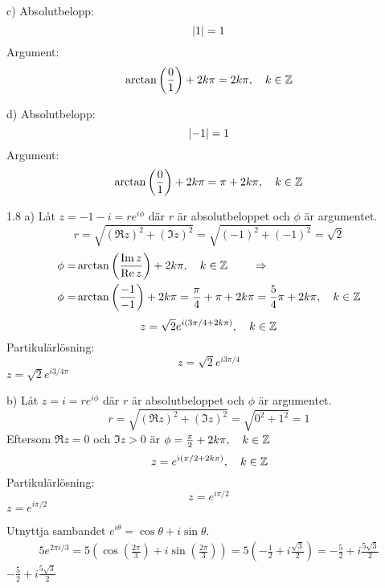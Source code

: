 \begin{task}{c)}
	Absolutbelopp:
	\[\left|1\right|=1\]
	Argument:
	\[\arctan\left(\frac{0}{1}\right)+2k\pi=2k\pi, \quad k\in\mathbb{Z}\]
\end{task}

\begin{task}{d)}
	Absolutbelopp:
	\[\left|-1\right|=1\]
	Argument:
	\[\arctan\left(\frac{0}{1}\right)+2k\pi=\pi+2k\pi, \quad k\in\mathbb{Z}\]
\end{task}

\begin{task}{1.8 a)}
	Låt $z = -1-i = re^{i\phi}$ där $r$ är absolutbeloppet och $\phi$ är argumentet.
	\[r=\sqrt{(\Re z)^2+(\Im z)^2}=
	\sqrt{(-1)^2+(-1)^2}=
	\sqrt{2}\]
	\begin{align*}
		\phi=&\arctan\left(\frac{\Im z}{\Re z}\right)+2k\pi\cond{k\inset{Z}} \qquad \ra \\
		\phi=&\arctan\left(\frac{-1}{-1}\right)+2k\pi=
		\frac{\pi}{4}+\pi+2k\pi=
		\frac{5}{4}\pi+2k\pi\cond{k\inset{Z}}
	\end{align*}
	\[z=\sqrt{2}e^{i(3\pi/4+2k\pi)}, \quad k\in\mathbb{Z}\]
	Partikulärlösning:
	\[z=\sqrt{2}e^{i3\pi/4}\]
	\ans $z=\sqrt{2}e^{i3/4\pi}$
\end{task}

\begin{task}{b)}
	Låt $z = i = re^{i\phi}$ där $r$ är absolutbeloppet och $\phi$ är argumentet.
	\[r=\sqrt{(\Re z)^2+(\Im z)^2}=
	\sqrt{0^2+1^2}=
	1\]
	Eftersom $\Re z = 0$ och $\Im z > 0$ är $\phi=\frac{\pi}{2} + 2k\pi, \quad k\in\mathbb{Z}$
	\[z=e^{i(\pi/2+2k\pi)}, \quad k\in\mathbb{Z}\]
	Partikulärlösning:
	\[z=e^{i\pi/2}\]
	\ans $z=e^{i\pi/2}$
\end{task}

\begin{task}{1.9}
	Utnyttja sambandet $e^{i\theta}=\cos\theta+i\sin\theta$.
	\begin{align*}
		5e^{2\pi i/3}=
		5\left(\cos\left(\frac{2\pi}{3}\right)+i\sin\left(\frac{2\pi}{3}\right)\right)=
		5\left(-\frac{1}{2}+i\frac{\sqrt{3}}{2}\right)=
		-\frac{5}{2}+i\frac{5\sqrt{3}}{2}
	\end{align*}
	\ans $-\frac{5}{2}+i\frac{5\sqrt{3}}{2}$
\end{task}

